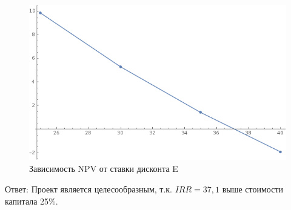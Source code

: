 \begin{figure}[h]
	\centering
	\includegraphics[width=1\linewidth]{npvegr}
	\caption{Зависимость NPV от ставки дисконта E}
	\label{fig:npvegr}
\end{figure}

Ответ: Проект является целесообразным, т.к. $IRR = 37,1$ выше стоимости капитала 25\%.
